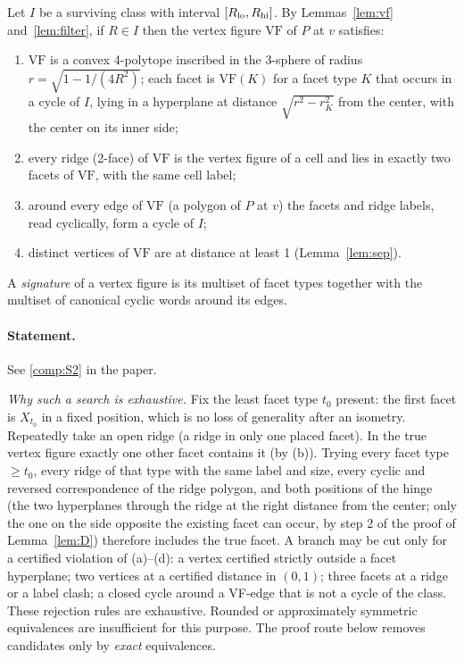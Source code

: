 \documentclass[11pt]{article}
\theoremstyle{definition}
\theoremstyle{remark}
\newcommand{\VF}{\mathrm{VF}}
\begin{document}
Let $I$ be a surviving class with interval $[R_{\rm lo},R_{\rm hi}]$. By
Lemmas~\ref{lem:vf} and~\ref{lem:filter}, if $R\in I$ then the vertex
figure $\VF$ of $P$ at $v$ satisfies:
\begin{enumerate}[label=(\alph*)]
\item $\VF$ is a convex 4-polytope inscribed in the 3-sphere of radius
  $r=\sqrt{1-1/(4R^2)}$; each facet is $\VF(K)$ for a facet type $K$ that
  occurs in a cycle of $I$, lying in a hyperplane at distance
  $\sqrt{r^2-r_K^2}$ from the center, with the center on its inner side;
\item every ridge (2-face) of $\VF$ is the vertex figure of a cell and lies
  in exactly two facets of $\VF$, with the same cell label;
\item around every edge of $\VF$ (a polygon of $P$ at $v$) the facets and
  ridge labels, read cyclically, form a cycle of $I$;
\item distinct vertices of $\VF$ are at distance at least 1
  (Lemma~\ref{lem:sep}).
\end{enumerate}
A \emph{signature} of a vertex figure is its multiset of facet types
together with the multiset of canonical cyclic words around its edges.

\setcounter{theorem}{5}
\paragraph{Statement.} See \ref{comp:S2} in the paper.


\noindent\emph{Why such a search is exhaustive.} Fix the least facet type
$t_0$ present: the first facet is $X_{t_0}$ in a fixed position, which is
no loss of generality after an isometry. Repeatedly take an open ridge (a
ridge in only one placed facet). In the true vertex figure exactly one
other facet contains it (by (b)). Trying every facet type $\ge t_0$, every
ridge of that type with the same label and size, every cyclic and reversed
correspondence of the ridge polygon, and both positions of the hinge (the
two hyperplanes through the ridge at the right distance from the center;
only the one on the side opposite the existing facet can occur, by step 2
of the proof of Lemma~\ref{lem:D}) therefore includes the true facet. A branch may be cut only for a
certified violation of (a)--(d): a vertex certified strictly outside a
facet hyperplane; two vertices at a certified distance in $(0,1)$; three
facets at a ridge or a label clash; a closed cycle around a VF-edge that is
not a cycle of the class. These rejection rules are exhaustive. Rounded or approximately
symmetric equivalences are insufficient for this purpose. The
proof route below removes candidates only by \emph{exact} equivalences.
\end{document}
